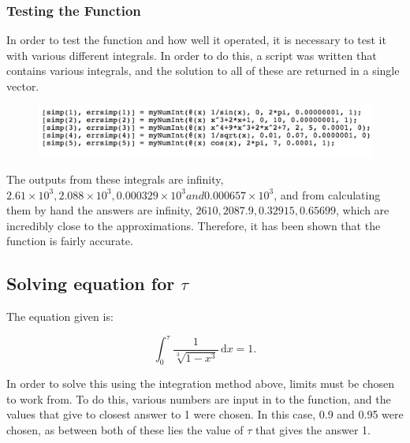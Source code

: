 \documentclass[a4paper]{article}
\begin{document}
\subsubsection{Testing the Function}

In order to test the function and how well it operated, it is necessary to test it with various different integrals. In order to do this, a script was written that contains various integrals, and the solution to all of these are returned in a single vector.  


\begin{figure}[H]
\includegraphics[width=1\textwidth]{numinttest.jpg}
\end{figure}


The outputs from these integrals are infinity, $2.61\times 10^3, 2.088\times 10^3, 0.000329\times 10^3 and 0.000657\times 10^3$, and from calculating them by hand the answers are infinity, $2610, 2087.9, 0.32915, 0.65699$, which are incredibly close to the approximations. Therefore, it has been shown that the function is fairly accurate.


\subsection{Solving equation for $\tau$ }


The equation given is:


$$\int_0^\tau \!\frac{1}{\sqrt[3]{1-x^{3}}}\, \mathrm{d}x=1.$$
\newline


In order to solve this using the integration method above, limits must be chosen to work from. To do this, various numbers are input in to the function, and the values that give to closest answer to 1 were chosen. In this case, 0.9 and 0.95 were chosen, as between both of these lies the value of $\tau$ that gives the answer 1. 
\newline \newline
\end{document}
